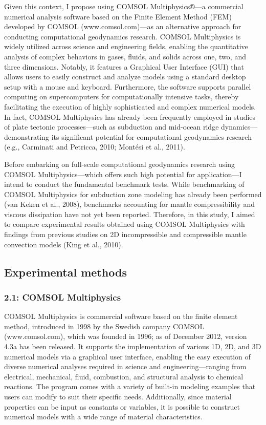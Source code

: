 Given this context, I propose using COMSOL Multiphysics®—a commercial numerical analysis software based on the Finite Element Method (FEM) developed by COMSOL (www.comsol.com)—as an alternative approach for conducting computational geodynamics research. COMSOL Multiphysics is widely utilized across science and engineering fields, enabling the quantitative analysis of complex behaviors in gases, fluids, and solids across one, two, and three dimensions. Notably, it features a Graphical User Interface (GUI) that allows users to easily construct and analyze models using a standard desktop setup with a mouse and keyboard. Furthermore, the software supports parallel computing on supercomputers for computationally intensive tasks, thereby facilitating the execution of highly sophisticated and complex numerical models. In fact, COMSOL Multiphysics has already been frequently employed in studies of plate tectonic processes—such as subduction and mid-ocean ridge dynamics—demonstrating its significant potential for computational geodynamics research (e.g., Carminati and Petricca, 2010; Montési et al., 2011).

Before embarking on full-scale computational geodynamics research using COMSOL Multiphysics—which offers such high potential for application—I intend to conduct the fundamental benchmark tests. While benchmarking of COMSOL Multiphysics for subduction zone modeling has already been performed (van Keken et al., 2008), benchmarks accounting for mantle compressibility and viscous dissipation have not yet been reported. Therefore, in this study, I aimed to compare experimental results obtained using COMSOL Multiphysics with findings from previous studies on 2D incompressible and compressible mantle convection models (King et al., 2010).

\subsection{Experimental methods}

\subsubsection{2.1: COMSOL Multiphysics}

COMSOL Multiphysics is commercial software based on the finite element method, introduced in 1998 by the Swedish company COMSOL (www.comsol.com), which was founded in 1996; as of December 2012, version 4.3a has been released. It supports the implementation of various 1D, 2D, and 3D numerical models via a graphical user interface, enabling the easy execution of diverse numerical analyses required in science and engineering—ranging from electrical, mechanical, fluid, combustion, and structural analysis to chemical reactions. The program comes with a variety of built-in modeling examples that users can modify to suit their specific needs. Additionally, since material properties can be input as constants or variables, it is possible to construct numerical models with a wide range of material characteristics.

